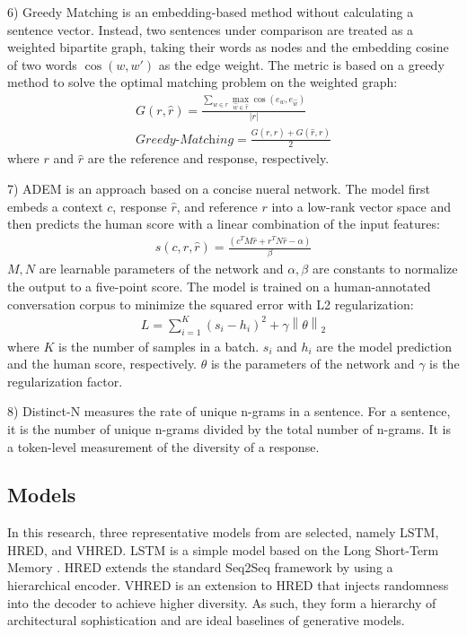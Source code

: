 \documentclass[conference]{IEEEtran}
\begin{document}
6) Greedy Matching \cite{GreedyAndOptimal} is an embedding-based method without calculating a sentence vector.
Instead, two sentences under comparison are treated as a weighted bipartite graph, taking their words as nodes and the embedding cosine of two words $\cos(w, w')$ as the edge weight.
The metric is based on a greedy method to solve the optimal matching problem on the weighted graph:
\begin{align}
    G(r, \hat{r}) = \frac{
    \sum_{w \in r} \max_{\hat{w} \in \hat{r}} \cos(e_w, e_{\hat{w}})
    }{ |r| } \\
    \textit{Greedy-Matching} = \frac{
    G(r, \hat{r}) + G(\hat{r}, r)
    }{2}
\end{align}
where $r$ and $\hat{r}$ are the reference and response, respectively.

7) ADEM \cite{ADEM} is an approach based on a concise nueral network.
The model first embeds a context $c$, response $\hat{r}$, and reference $r$ into a low-rank vector space and then predicts the human score with a linear combination of the input features:
\begin{align}
    s(c, r, \hat{r}) = \frac{(c^T M \hat{r} + r^T N \hat{r} - \alpha)}{\beta}
\end{align}
$M, N$ are learnable parameters of the network and $\alpha, \beta$ are constants to normalize the output to a five-point score.
The model is trained on a human-annotated conversation corpus to minimize the squared error with L2 regularization:
\begin{align}
    L = \sum_{i=1}^{K} (s_i - h_i)^2 + \gamma \left\| \theta \right\| _2
\end{align}
where $K$ is the number of samples in a batch.
$s_i$ and $h_i$ are the model prediction and the human score, respectively.
$\theta$ is the parameters of the network and $\gamma$ is the regularization factor.

8) Distinct-N \cite{MMI} measures the rate of unique n-grams in a sentence.
For a sentence, it is the number of unique n-grams divided by the total number of n-grams.
It is a token-level measurement of the diversity of a response.

\subsection{Models}
In this research, three representative models from \cite{VHRED} are selected, namely LSTM, HRED, and VHRED. LSTM is a simple model based on the Long Short-Term Memory \cite{LSTM}.
HRED extends the standard Seq2Seq framework by using a hierarchical encoder.
VHRED is an extension to HRED that injects randomness into the decoder to achieve higher diversity.
As such, they form a hierarchy of architectural sophistication and are ideal baselines of generative models.
\end{document}
